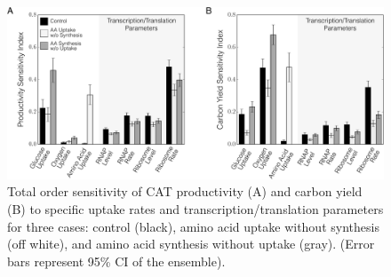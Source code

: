 \documentclass[journal=asbcd6,manuscript=article]{achemso}
\begin{document}
\begin{figure}[t!]
\includegraphics[width=1.00\textwidth]{./Figures/SI_CAT.pdf}
\caption{Total order sensitivity of CAT productivity (A) and carbon yield (B) to specific uptake rates and transcription/translation parameters for three cases: control (black), amino acid uptake without synthesis (off white), and amino acid synthesis without uptake (gray). (Error bars represent 95\% CI of the ensemble).}
\label{fig:SI_CAT}
\end{figure}
\end{document}

